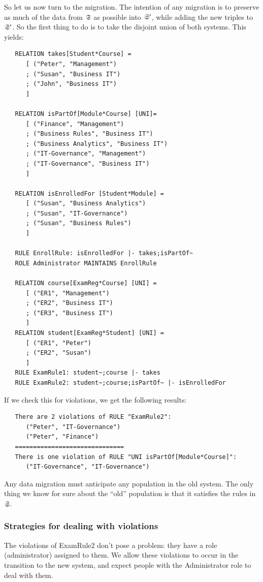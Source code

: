 \documentclass{elsarticle}
\begin{document}
   So let us now turn to the migration.
   The intention of any migration is to preserve as much of the data from $\mathfrak{S}$ as possible into $\mathfrak{S}'$,
   while adding the new triples to $\mathfrak{S}'$.
   So the first thing to do is to take the disjoint union of both systems.
   This yields:
\begin{verbatim}
   RELATION takes[Student*Course] =
      [ ("Peter", "Management")
      ; ("Susan", "Business IT")
      ; ("John", "Business IT")
      ]
   
   RELATION isPartOf[Module*Course] [UNI]=
      [ ("Finance", "Management")
      ; ("Business Rules", "Business IT")
      ; ("Business Analytics", "Business IT")
      ; ("IT-Governance", "Management")
      ; ("IT-Governance", "Business IT")
      ]
   
   RELATION isEnrolledFor [Student*Module] =
      [ ("Susan", "Business Analytics")
      ; ("Susan", "IT-Governance")
      ; ("Susan", "Business Rules")
      ]
   
   RULE EnrollRule: isEnrolledFor |- takes;isPartOf~
   ROLE Administrator MAINTAINS EnrollRule
   
   RELATION course[ExamReg*Course] [UNI] =
      [ ("ER1", "Management")
      ; ("ER2", "Business IT")
      ; ("ER3", "Business IT")
      ]
   RELATION student[ExamReg*Student] [UNI] =
      [ ("ER1", "Peter")
      ; ("ER2", "Susan")
      ]
   RULE ExamRule1: student~;course |- takes
   RULE ExamRule2: student~;course;isPartOf~ |- isEnrolledFor
\end{verbatim}
   If we check this for violations, we get the following results:
\begin{verbatim}
   There are 2 violations of RULE "ExamRule2":
      ("Peter", "IT-Governance")
      ("Peter", "Finance")
   ==============================
   There is one violation of RULE "UNI isPartOf[Module*Course]":
      ("IT-Governance", "IT-Governance")
\end{verbatim}
   Any data migration must anticipate any population in the old system.
   The only thing we know for sure about the ``old'' population is that it satisfies the rules in $\mathfrak{S}$.

\subsubsection{Strategies for dealing with violations}

The violations of ExamRule2 don't pose a problem: they have a role (administrator) assigned to them.
We allow these violations to occur in the transition to the new system, and expect people with the Administrator role to deal with them.
\end{document}
